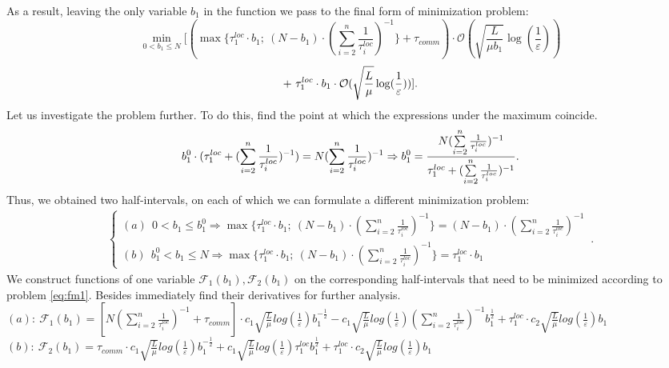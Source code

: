 \documentclass{article}
\begin{document}
As a result, leaving the only variable $b_1$ in the function we pass to the final form of minimization problem:
\\
\begin{equation}
    \label{eq:fm1}
      \underset{0 < b_1 \leq N}{\min}[(\max\{\tau_1^{loc}\cdot b_1; ~(N-b_1) \cdot (\sum\limits_{i = 2}^{n} \frac{1}{\tau_i^{loc}} )^{-1}\} + \tau_{comm}) \cdot \mathcal O(\sqrt{\frac{L}{\mu b_1}}\log(\frac{1}{\varepsilon}))
\end{equation}
\begin{equation}
     \notag
     + ~
    \tau_1^{loc}\cdot b_1 \cdot \mathcal O(\sqrt{\frac{L}{\mu}}\log(\frac{1}{\varepsilon}))] .
\end{equation}
Let us investigate the problem further. To do this, find the point at which the expressions under the maximum coincide. 
\begin{equation}
    \notag
    b_1^0 \cdot (\tau_1^{loc} + (\sum\limits_{i = 2}^{n} \frac{1}{\tau_i^{loc}})^{-1}) = N (\sum\limits_{i = 2}^{n} \frac{1}{\tau_i^{loc}})^{-1} \Rightarrow b_1^0 = \frac{N (\sum\limits_{i = 2}^{n} \frac{1}{\tau_i^{loc}})^{-1}}{\tau_1^{loc} + (\sum\limits_{i = 2}^{n} \frac{1}{\tau_i^{loc}})^{-1}}.
\end{equation}
Thus, we obtained two half-intervals, on each of which we can formulate a different minimization problem:
\begin{eqnarray}
\label{half-int}
    \begin{cases}
    (a) ~ ~ 0 < b_1 \leq b_1^0 \Rightarrow \max\{\tau_1^{loc}\cdot b_1; ~(N-b_1) \cdot (\sum\limits_{i = 2}^{n} \frac{1}{\tau_i^{loc}} )^{-1}\} = 
    (N-b_1) \cdot (\sum\limits_{i = 2}^{n} \frac{1}{\tau_i^{loc}})^{-1}
    \\
    (b) ~ ~ b_1^0 <  b_1 \leq N \Rightarrow \max\{\tau_1^{loc}\cdot b_1; ~(N-b_1) \cdot (\sum\limits_{i = 2}^{n} \frac{1}{\tau_i^{loc}} )^{-1}\} = \tau_1^{loc}\cdot b_1
    \end{cases}\,.
\end{eqnarray}
We construct functions of one variable $\mathcal{F}_1(b_1), \mathcal{F}_2(b_1)$ on the corresponding half-intervals that need to be minimized according to problem \eqref{eq:fm1}. Besides immediately find their derivatives for further analysis.\\
$(a): ~\mathcal{F}_1(b_1) = [N (\sum\limits_{i = 2}^{n} \frac{1}{\tau_i^{loc}})^{-1} + \tau_{comm}]\cdot 
c_1 \sqrt{\frac{L}{\mu}}log (\frac{1}{\varepsilon})  b_1^{-\frac{1}{2}} - 
c_1  \sqrt{\frac{L}{\mu}}log (\frac{1}{\varepsilon})(\sum\limits_{i =
2}^{n} \frac{1}{\tau_i^{loc}})^{-1} b_1^{\frac{1}{2}}  + \tau_1^{loc}\cdot c_2  \sqrt{\frac{L}{\mu}}log (\frac{1}{\varepsilon}) b_1 $\\
$(b): ~\mathcal{F}_2(b_1) = \tau_{comm}\cdot 
c_1 \sqrt{\frac{L}{\mu}}log (\frac{1}{\varepsilon})  b_1^{-\frac{1}{2}} + 
c_1  \sqrt{\frac{L}{\mu}}log (\frac{1}{\varepsilon})\tau_1^{loc} b_1^{\frac{1}{2}}  + \tau_1^{loc}\cdot c_2  \sqrt{\frac{L}{\mu}}log (\frac{1}{\varepsilon}) b_1 $\\
\end{document}
